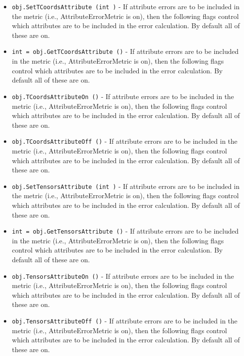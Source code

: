 \begin{itemize}
\item  \verb|obj.SetTCoordsAttribute (int )| -  If attribute errors are to be included in the metric (i.e.,
 AttributeErrorMetric is on), then the following flags control which
 attributes are to be included in the error calculation. By default all
 of these are on.

\item  \verb|int = obj.GetTCoordsAttribute ()| -  If attribute errors are to be included in the metric (i.e.,
 AttributeErrorMetric is on), then the following flags control which
 attributes are to be included in the error calculation. By default all
 of these are on.

\item  \verb|obj.TCoordsAttributeOn ()| -  If attribute errors are to be included in the metric (i.e.,
 AttributeErrorMetric is on), then the following flags control which
 attributes are to be included in the error calculation. By default all
 of these are on.

\item  \verb|obj.TCoordsAttributeOff ()| -  If attribute errors are to be included in the metric (i.e.,
 AttributeErrorMetric is on), then the following flags control which
 attributes are to be included in the error calculation. By default all
 of these are on.

\item  \verb|obj.SetTensorsAttribute (int )| -  If attribute errors are to be included in the metric (i.e.,
 AttributeErrorMetric is on), then the following flags control which
 attributes are to be included in the error calculation. By default all
 of these are on.

\item  \verb|int = obj.GetTensorsAttribute ()| -  If attribute errors are to be included in the metric (i.e.,
 AttributeErrorMetric is on), then the following flags control which
 attributes are to be included in the error calculation. By default all
 of these are on.

\item  \verb|obj.TensorsAttributeOn ()| -  If attribute errors are to be included in the metric (i.e.,
 AttributeErrorMetric is on), then the following flags control which
 attributes are to be included in the error calculation. By default all
 of these are on.

\item  \verb|obj.TensorsAttributeOff ()| -  If attribute errors are to be included in the metric (i.e.,
 AttributeErrorMetric is on), then the following flags control which
 attributes are to be included in the error calculation. By default all
 of these are on.


\end{itemize}
